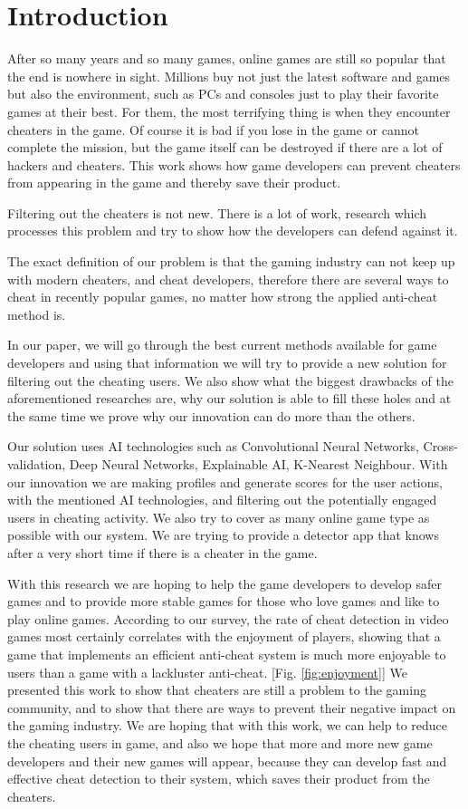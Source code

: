 \section{Introduction}
\label{ch:intro}

After so many years and so many games, online games are still so popular that the end is nowhere in sight.
Millions buy not just the latest software and games but also the environment, such as PCs and consoles just to play their favorite games at their best.
For them, the most terrifying thing is when they encounter cheaters in the game.
Of course it is bad if you lose in the game or cannot complete the mission, but the game itself can be destroyed if there are a lot of hackers and cheaters.
This work shows how game developers can prevent cheaters from appearing in the game and thereby save their product.

Filtering out the cheaters is not new. 
There is a lot of work, research which processes this problem and try to show how the developers can defend against it.

The exact definition of our problem is that the gaming industry can not keep up with modern cheaters, and cheat developers, therefore there are several ways to cheat in recently popular games, no matter how strong the applied anti-cheat method is. 

In our paper, we will go through the best current methods available for game developers and using that information we will try to provide a new solution for filtering out the cheating users.
We also show what the biggest drawbacks of the aforementioned researches are, why our solution is able to fill these holes and at the same time we prove why our innovation can do more than the others.

Our solution uses AI technologies such as Convolutional Neural Networks, Cross-validation, Deep Neural Networks, Explainable AI, K-Nearest Neighbour.
With our innovation we are making profiles and generate scores for the user actions, with the mentioned AI technologies, and filtering out the potentially engaged users in cheating activity. 
We also try to cover as many online game type as possible with our system. We are trying to provide a detector app that knows after a very short time if there is a cheater in the game.

With this research we are hoping to help the game developers to develop safer games and to provide more stable games for those who love games and like to play online games.
According to our survey, the rate of cheat detection in video games most certainly correlates with the enjoyment of players, showing that a game that implements an efficient anti-cheat system is much more enjoyable to users than a game with a lackluster anti-cheat. [Fig. \ref{fig:enjoyment}]
We presented this work to show that cheaters are still a problem to the gaming community, and to show that there are ways to prevent their negative impact on the gaming industry.
We are hoping that with this work, we can help to reduce the cheating users in game, and also we hope that more and more new game developers and their new games will appear, because they can develop fast and effective cheat detection to their system, which saves their product from the cheaters.

